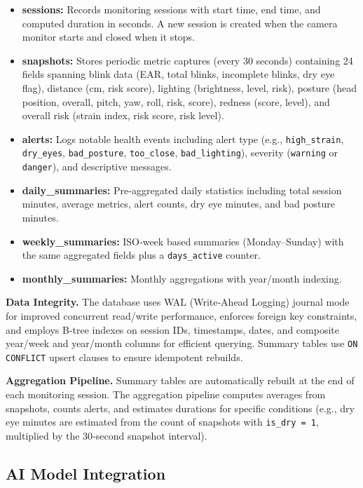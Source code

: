 \documentclass[12pt]{report}
\begin{document}
\begin{itemize}
    \item \textbf{sessions:} Records monitoring sessions with start time, end time, and computed duration in seconds. A new session is created when the camera monitor starts and closed when it stops.
    \item \textbf{snapshots:} Stores periodic metric captures (every 30 seconds) containing 24 fields spanning blink data (EAR, total blinks, incomplete blinks, dry eye flag), distance (cm, risk score), lighting (brightness, level, risk), posture (head position, overall, pitch, yaw, roll, risk, score), redness (score, level), and overall risk (strain index, risk score, risk level).
    \item \textbf{alerts:} Logs notable health events including alert type (e.g., \texttt{high\_strain}, \texttt{dry\_eyes}, \texttt{bad\_posture}, \texttt{too\_close}, \texttt{bad\_lighting}), severity (\texttt{warning} or \texttt{danger}), and descriptive messages.
    \item \textbf{daily\_summaries:} Pre‑aggregated daily statistics including total session minutes, average metrics, alert counts, dry eye minutes, and bad posture minutes.
    \item \textbf{weekly\_summaries:} ISO‑week based summaries (Monday–Sunday) with the same aggregated fields plus a \texttt{days\_active} counter.
    \item \textbf{monthly\_summaries:} Monthly aggregations with year/month indexing.
\end{itemize}

\textbf{Data Integrity.} The database uses WAL (Write‑Ahead Logging) journal mode for improved concurrent read/write performance, enforces foreign key constraints, and employs B‑tree indexes on session IDs, timestamps, dates, and composite year/week and year/month columns for efficient querying. Summary tables use \texttt{ON CONFLICT} upsert clauses to ensure idempotent rebuilds.

\textbf{Aggregation Pipeline.} Summary tables are automatically rebuilt at the end of each monitoring session. The aggregation pipeline computes averages from snapshots, counts alerts, and estimates durations for specific conditions (e.g., dry eye minutes are estimated from the count of snapshots with \texttt{is\_dry = 1}, multiplied by the 30‑second snapshot interval).

\subsection{AI Model Integration}
\end{document}
